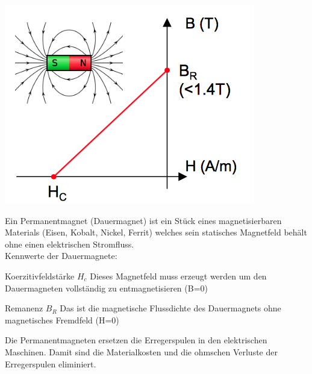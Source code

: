 \begin{minipage}{0.3 \linewidth}
\includegraphics[width = \linewidth]{./Pics/VL2/permanentMagnet}
\end{minipage}
\begin{minipage}{0.7 \linewidth}
Ein Permanentmagnet (Dauermagnet) ist ein Stück eines magnetisierbaren Materials (Eisen, Kobalt, Nickel, Ferrit) welches sein statisches Magnetfeld behält ohne einen elektrischen Stromfluss. \\

Kennwerte der Dauermagnete:
\begin{description}
\item{Koerzitivfeldstärke $H_c$} Dieses Magnetfeld muss erzeugt werden um den Dauermagneten vollständig zu entmagnetisieren (B=0)
\item{Remanenz $B_R$} Das ist die magnetische Flussdichte des Dauermagnets ohne magnetisches Fremdfeld (H=0)
\end{description}

Die Permanentmagneten ersetzen die Erregerspulen in den elektrischen Maschinen. Damit sind die Materialkosten und die ohmschen Verluste der Erregerspulen eliminiert. 
\end{minipage}

